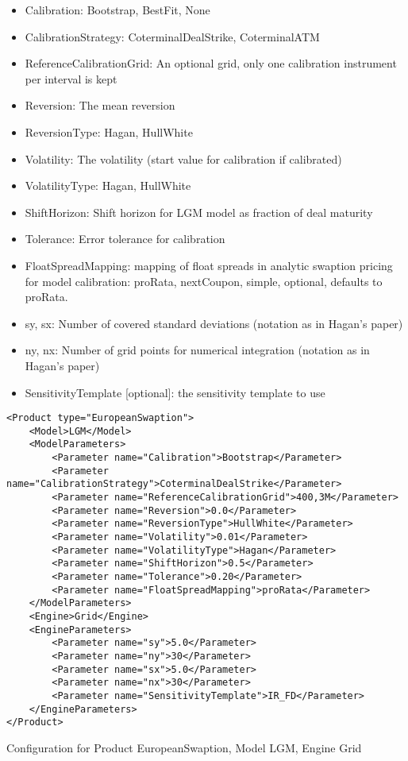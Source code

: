 \begin{itemize}
\item Calibration: Bootstrap, BestFit, None
\item CalibrationStrategy: CoterminalDealStrike, CoterminalATM
\item ReferenceCalibrationGrid: An optional grid, only one calibration instrument per interval is kept
\item Reversion: The mean reversion
\item ReversionType: Hagan, HullWhite
\item Volatility: The volatility (start value for calibration if calibrated)
\item VolatilityType: Hagan, HullWhite
\item ShiftHorizon: Shift horizon for LGM model as fraction of deal maturity
\item Tolerance: Error tolerance for calibration
\item FloatSpreadMapping: mapping of float spreads in analytic swaption pricing for model calibration: proRata,
  nextCoupon, simple, optional, defaults to proRata.
\item sy, sx: Number of covered standard deviations (notation as in Hagan's paper)
\item ny, nx: Number of grid points for numerical integration (notation as in Hagan's paper)
\item SensitivityTemplate [optional]: the sensitivity template to use 
\end{itemize}

\begin{longlisting}
\begin{verbatim}
<Product type="EuropeanSwaption">
    <Model>LGM</Model>
    <ModelParameters>
        <Parameter name="Calibration">Bootstrap</Parameter>
        <Parameter name="CalibrationStrategy">CoterminalDealStrike</Parameter>
        <Parameter name="ReferenceCalibrationGrid">400,3M</Parameter>
        <Parameter name="Reversion">0.0</Parameter>
        <Parameter name="ReversionType">HullWhite</Parameter>
        <Parameter name="Volatility">0.01</Parameter>
        <Parameter name="VolatilityType">Hagan</Parameter>
        <Parameter name="ShiftHorizon">0.5</Parameter>
        <Parameter name="Tolerance">0.20</Parameter>
        <Parameter name="FloatSpreadMapping">proRata</Parameter>
    </ModelParameters>
    <Engine>Grid</Engine>
    <EngineParameters>
        <Parameter name="sy">5.0</Parameter>
        <Parameter name="ny">30</Parameter>
        <Parameter name="sx">5.0</Parameter>
        <Parameter name="nx">30</Parameter>
        <Parameter name="SensitivityTemplate">IR_FD</Parameter>
    </EngineParameters>
</Product>
\end{verbatim}
\caption{Configuration for Product EuropeanSwaption, Model LGM, Engine Grid}
\label{lst:peconfig_EuropeanSwaption_LGM_Grid}
\end{longlisting}

